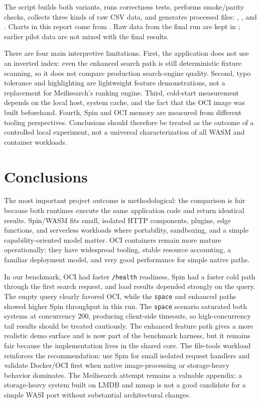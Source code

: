 \documentclass[11pt,a4paper]{article}
\begin{document}
The script builds both variants, runs correctness tests, performs smoke/parity checks, collects
three kinds of raw CSV data, and generates processed files:
,
, and
. Charts in this report come from
. Raw data from the final run are kept in ; earlier pilot
data are not mixed with the final results.

There are four main interpretive limitations. First, the application does not use an inverted
index: even the enhanced search path is still deterministic fixture scanning, so it does not
compare production search-engine quality. Second, typo tolerance and highlighting are lightweight
feature demonstrations, not a replacement for Meilisearch's ranking engine. Third, cold-start
measurement depends on the local host, system cache, and the fact that the OCI image was built
beforehand. Fourth, Spin and OCI memory are measured from different tooling perspectives.
Conclusions should therefore be treated as the outcome of a controlled local experiment, not a
universal characterization of all WASM and container workloads.

\section{Conclusions}

The most important project outcome is methodological: the comparison is fair because both
runtimes execute the same application code and return identical results. Spin/WASM fits small,
isolated HTTP components, plugins, edge functions, and serverless workloads where portability,
sandboxing, and a simple capability-oriented model matter. OCI containers remain more mature
operationally: they have widespread tooling, stable resource accounting, a familiar deployment
model, and very good performance for simple native paths.

In our benchmark, OCI had faster \texttt{/health} readiness, Spin had a faster cold path through
the first search request, and load results depended strongly on the query. The empty query clearly
favored OCI, while the \texttt{space} and enhanced paths showed higher Spin throughput in this run.
The \texttt{space} scenario saturated both systems at concurrency 200, producing client-side
timeouts, so high-concurrency tail results should be treated cautiously. The enhanced feature path
gives a more realistic demo surface and is now part of the benchmark harness, but it remains fair
because the implementation lives in the shared core. The file-tools workload reinforces the
recommendation: use Spin for small isolated request handlers and validate Docker/OCI first when
native image-processing or storage-heavy behavior dominates. The Meilisearch attempt remains a
valuable appendix: a storage-heavy system built on LMDB
and mmap is not a good candidate for a simple WASI port without substantial architectural changes.
\end{document}
